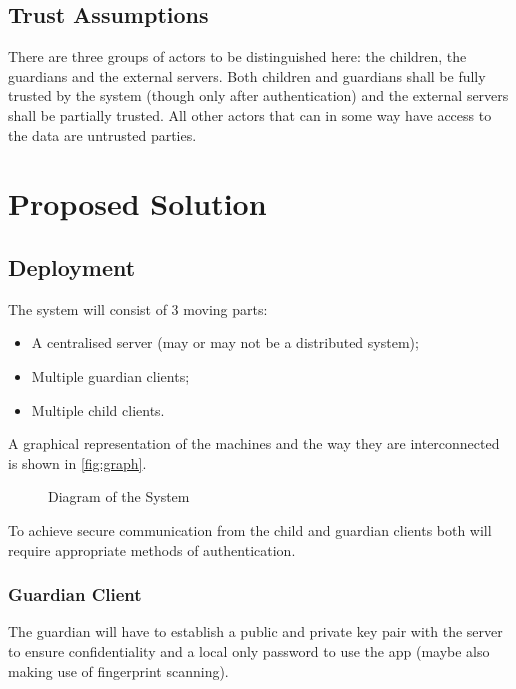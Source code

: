 \documentclass[a4paper]{article}
\begin{document}
\subsection{Trust Assumptions}
There are three groups of actors to be distinguished here: the children, the guardians and the
external servers. Both children and guardians shall be fully trusted by the system (though only
after authentication) and the external servers shall be partially trusted. All other actors that can
in some way have access to the data are untrusted parties.

\section{Proposed Solution}

\subsection{Deployment}

The system will consist of 3 moving parts:

\begin{itemize}
    \item A centralised server (may or may not be a distributed system);
    \item Multiple guardian clients;
    \item Multiple child clients.
\end{itemize}

A graphical representation of the machines and the way they are interconnected is shown in
\autoref{fig:graph}.

\begin{figure}
    \centering
    
    \caption{Diagram of the System}\label{fig:graph}
\end{figure}

To achieve secure communication from the child and guardian clients both will require appropriate
methods of authentication.

\subsubsection{Guardian Client}
The guardian will have to establish a public and private key pair with the server to ensure
confidentiality and a local only password to use the app (maybe also making use of fingerprint
scanning).
\end{document}
